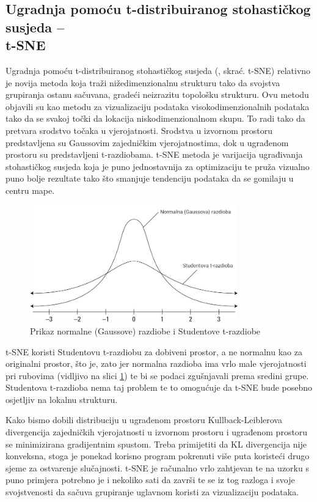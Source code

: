 \documentclass[times, utf8, diplomski]{fer}
\begin{document}
\subsection[Ugradnja pomoću t-distribuiranog stohastičkog susjeda -- t-SNE]{Ugradnja pomoću t-distribuiranog stohastičkog susjeda --\\ t-SNE}
Ugradnja pomoću t-distribuiranog stohastičkog susjeda (, skrać. t-SNE) relativno je novija metoda koja traži nižedimenzionalnu strukturu tako da svojstva grupiranja ostanu sačuvana, gradeći neizrazitu  topološku strukturu. Ovu metodu objavili su \cite{maaten2008visualizing} kao metodu za vizualizaciju podataka visokodimenzionalnih podataka tako da se svakoj točki da lokacija niskodimenzionalnom skupu. To radi tako da pretvara srodstvo točaka u vjerojatnosti. Srodstva u izvornom prostoru predstavljena su Gaussovim zajedničkim vjerojatnostima, dok u ugrađenom prostoru su predstavljeni t-razdiobama. t-SNE metoda je varijacija ugrađivanja stohastičkog susjeda  koja je puno jednostavnija za optimizaciju te pruža vizualno puno bolje rezultate tako što smanjuje tendenciju podataka da se gomilaju u centru mape.
\begin{figure}[htb]
    \centering
    \includegraphics[width=9cm]{resources/images/reduction/tsne.jpg}
    \caption{Prikaz normalne (Gaussove) razdiobe i Studentove t-razdiobe}
    \label{fig:tsne}
\end{figure}

t-SNE koristi Studentovu t-razdiobu za dobiveni prostor, a ne normalnu kao za originalni prostor, što je, zato jer normalna razdioba ima vrlo male vjerojatnosti pri rubovima (vidljivo na slici \ref{fig:tsne}) te bi se podaci zgušnjavali prema sredini grupe. Studentova t-razdioba nema taj problem te to omogućuje da t-SNE bude posebno osjetljiv na lokalnu strukturu.

Kako bismo dobili distribuciju u ugrađenom prostoru Kullback-Leiblerova divergencija zajedničkih vjerojatnosti u izvornom prostoru i ugrađenom prostoru se minimizirana gradijentnim spustom. Treba primijetiti da KL divergencija nije konveksna, stoga je ponekad korisno program pokrenuti više puta koristeći drugo sjeme za ostvarenje slučajnosti. t-SNE je računalno vrlo zahtjevan te na uzorku s puno primjera potrebno je i nekoliko sati da završi te se iz tog razloga i svoje svojstvenosti da sačuva grupiranje uglavnom koristi za vizualizaciju podataka.
\end{document}
